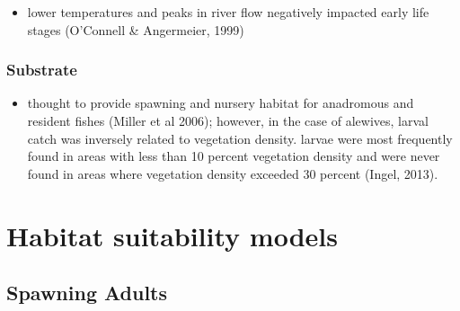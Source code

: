 \documentclass[
]{book}
\providecommand{\tightlist}{%
  \setlength{\itemsep}{0pt}\setlength{\parskip}{0pt}}
\begin{document}
\begin{itemize}
\tightlist
\item
  lower temperatures and peaks in river flow negatively impacted early life stages (O'Connell \& Angermeier, 1999)
\end{itemize}

\hypertarget{substrate-5}{%
\subsubsection{Substrate}\label{substrate-5}}

\begin{itemize}
\tightlist
\item
  thought to provide spawning and nursery habitat for anadromous and resident fishes (Miller et al 2006); however, in the case of alewives, larval catch was inversely related to vegetation density. larvae were most frequently found in areas with less than 10 percent vegetation density and were never found in areas where vegetation density exceeded 30 percent (Ingel, 2013).
\end{itemize}

\hypertarget{habitat-suitability-models}{%
\section{Habitat suitability models}\label{habitat-suitability-models}}

\hypertarget{spawning-adults-1}{%
\subsection{Spawning Adults}\label{spawning-adults-1}}
\end{document}
